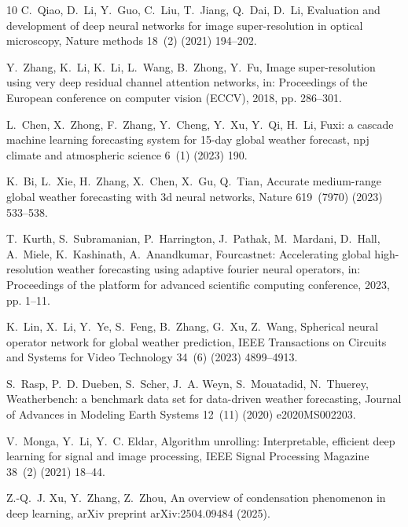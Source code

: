 \documentclass[preprint,numbers,sort&compress]{elsarticle}
\begin{document}
\begin{thebibliography}{10}
				C.~Qiao, D.~Li, Y.~Guo, C.~Liu, T.~Jiang, Q.~Dai, D.~Li, Evaluation and
				development of deep neural networks for image super-resolution in optical
				microscopy, Nature methods 18~(2) (2021) 194--202.
				
				Y.~Zhang, K.~Li, K.~Li, L.~Wang, B.~Zhong, Y.~Fu, Image super-resolution using
				very deep residual channel attention networks, in: Proceedings of the
				European conference on computer vision (ECCV), 2018, pp. 286--301.
				
				L.~Chen, X.~Zhong, F.~Zhang, Y.~Cheng, Y.~Xu, Y.~Qi, H.~Li, Fuxi: a cascade
				machine learning forecasting system for 15-day global weather forecast, npj
				climate and atmospheric science 6~(1) (2023) 190.
				
				K.~Bi, L.~Xie, H.~Zhang, X.~Chen, X.~Gu, Q.~Tian, Accurate medium-range global
				weather forecasting with 3d neural networks, Nature 619~(7970) (2023)
				533--538.
				
				T.~Kurth, S.~Subramanian, P.~Harrington, J.~Pathak, M.~Mardani, D.~Hall,
				A.~Miele, K.~Kashinath, A.~Anandkumar, Fourcastnet: Accelerating global
				high-resolution weather forecasting using adaptive fourier neural operators,
				in: Proceedings of the platform for advanced scientific computing conference,
				2023, pp. 1--11.
				
				K.~Lin, X.~Li, Y.~Ye, S.~Feng, B.~Zhang, G.~Xu, Z.~Wang, Spherical neural
				operator network for global weather prediction, IEEE Transactions on Circuits
				and Systems for Video Technology 34~(6) (2023) 4899--4913.
				
				S.~Rasp, P.~D. Dueben, S.~Scher, J.~A. Weyn, S.~Mouatadid, N.~Thuerey,
				Weatherbench: a benchmark data set for data-driven weather forecasting,
				Journal of Advances in Modeling Earth Systems 12~(11) (2020) e2020MS002203.
				
				V.~Monga, Y.~Li, Y.~C. Eldar, Algorithm unrolling: Interpretable, efficient
				deep learning for signal and image processing, IEEE Signal Processing
				Magazine 38~(2) (2021) 18--44.
				
				Z.-Q.~J. Xu, Y.~Zhang, Z.~Zhou, An overview of condensation phenomenon in deep
				learning, arXiv preprint arXiv:2504.09484 (2025).
				

\end{thebibliography}
\end{document}
